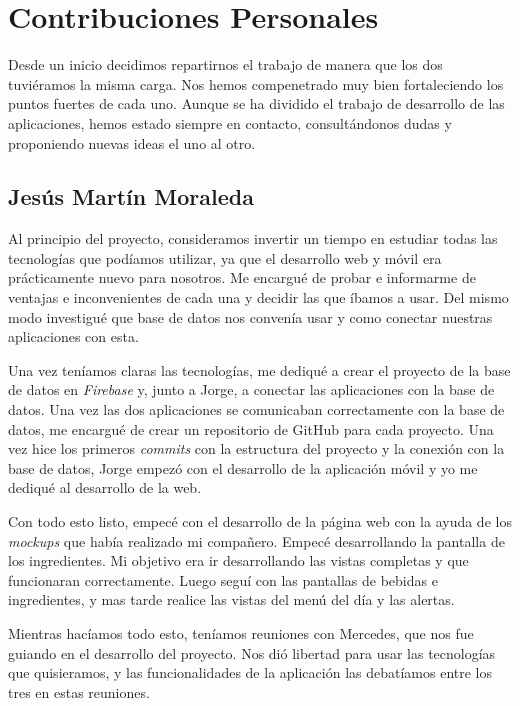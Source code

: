 \chapter*{Contribuciones Personales}
\label{cap:contribucionesPersonales}

Desde un inicio decidimos repartirnos el trabajo de manera que los dos tuviéramos la misma carga. Nos hemos compenetrado muy bien fortaleciendo los puntos fuertes de cada uno. Aunque se ha dividido el trabajo de desarrollo de las aplicaciones, hemos estado siempre en contacto, consultándonos dudas y proponiendo nuevas ideas el uno al otro.


\section*{Jesús Martín Moraleda}
Al principio del proyecto, consideramos invertir un tiempo en estudiar todas las tecnologías que podíamos utilizar, ya que el desarrollo web y móvil era prácticamente nuevo para nosotros. Me encargué de probar e informarme de ventajas e inconvenientes de cada una y decidir las que íbamos a usar.
Del mismo modo investigué que base de datos nos convenía usar y como conectar nuestras aplicaciones con esta.

Una vez teníamos claras las tecnologías, me dediqué a crear el proyecto de la base de datos en \textit{Firebase} y, junto a Jorge, a conectar las aplicaciones con la base de datos. Una vez las dos aplicaciones se comunicaban correctamente con la base de datos, me encargué de crear un repositorio de GitHub para cada proyecto. Una vez hice los primeros \textit{commits} con la estructura del proyecto y la conexión con la base de datos, Jorge empezó con el desarrollo de la aplicación móvil y yo me dediqué al desarrollo de la web.

Con todo esto listo, empecé con el desarrollo de la página web con la ayuda de los \textit{mockups} que había realizado mi compañero. Empecé desarrollando la pantalla de los ingredientes. Mi objetivo era ir desarrollando las vistas completas y que funcionaran correctamente. Luego seguí con las pantallas de bebidas e ingredientes, y mas tarde realice las vistas del menú del día y las alertas.

Mientras hacíamos todo esto, teníamos reuniones con Mercedes, que nos fue guiando en el desarrollo del proyecto. Nos dió libertad para usar las tecnologías que quisieramos, y las funcionalidades de la aplicación las debatíamos entre los tres en estas reuniones.

